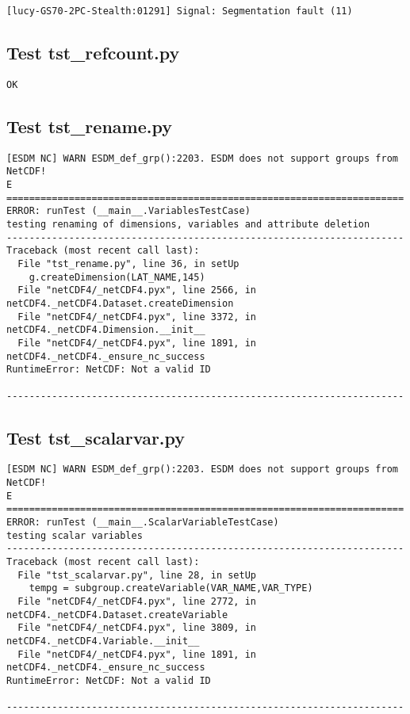 \begin{verbatim}
[lucy-GS70-2PC-Stealth:01291] Signal: Segmentation fault (11)
\end{verbatim}

\subsection{Test tst\_refcount.py}

\begin{verbatim}
OK
\end{verbatim}

\subsection{Test tst\_rename.py}

\begin{verbatim}
[ESDM NC] WARN ESDM_def_grp():2203. ESDM does not support groups from NetCDF!
E
======================================================================
ERROR: runTest (__main__.VariablesTestCase)
testing renaming of dimensions, variables and attribute deletion
----------------------------------------------------------------------
Traceback (most recent call last):
  File "tst_rename.py", line 36, in setUp
    g.createDimension(LAT_NAME,145)
  File "netCDF4/_netCDF4.pyx", line 2566, in netCDF4._netCDF4.Dataset.createDimension
  File "netCDF4/_netCDF4.pyx", line 3372, in netCDF4._netCDF4.Dimension.__init__
  File "netCDF4/_netCDF4.pyx", line 1891, in netCDF4._netCDF4._ensure_nc_success
RuntimeError: NetCDF: Not a valid ID

----------------------------------------------------------------------
\end{verbatim}

\subsection{Test tst\_scalarvar.py}

\begin{verbatim}
[ESDM NC] WARN ESDM_def_grp():2203. ESDM does not support groups from NetCDF!
E
======================================================================
ERROR: runTest (__main__.ScalarVariableTestCase)
testing scalar variables
----------------------------------------------------------------------
Traceback (most recent call last):
  File "tst_scalarvar.py", line 28, in setUp
    tempg = subgroup.createVariable(VAR_NAME,VAR_TYPE)
  File "netCDF4/_netCDF4.pyx", line 2772, in netCDF4._netCDF4.Dataset.createVariable
  File "netCDF4/_netCDF4.pyx", line 3809, in netCDF4._netCDF4.Variable.__init__
  File "netCDF4/_netCDF4.pyx", line 1891, in netCDF4._netCDF4._ensure_nc_success
RuntimeError: NetCDF: Not a valid ID

----------------------------------------------------------------------
\end{verbatim}

